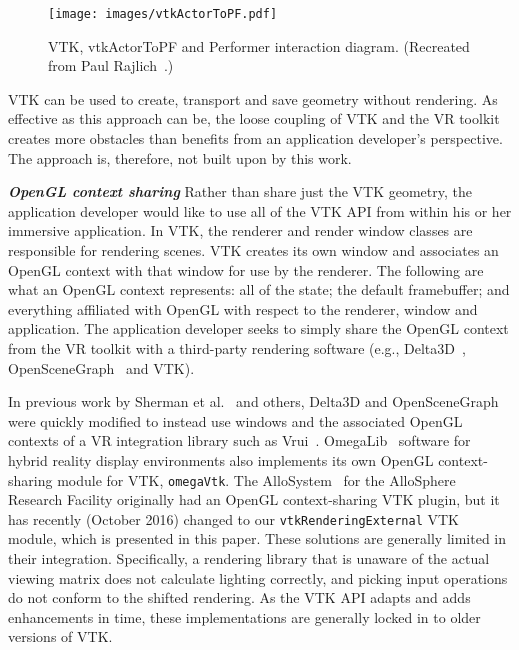 \begin{figure}[h!]
  \centering
  \texttt{[image: images/vtkActorToPF.pdf]}
  \caption{VTK, vtkActorToPF and Performer interaction diagram. (Recreated from Paul Rajlich~\cite{Leigh98limbo/vtk}.)}
  \label{fig:vtkActorToPF}
\end{figure}

VTK can be used to create, transport and save geometry without rendering. As effective as this approach can be, the loose coupling of VTK and the VR toolkit creates more obstacles than benefits from an application developer's perspective. The approach is, therefore, not built upon by this work.

\textbf{\textit{OpenGL context sharing}} Rather than share just the VTK geometry, the application developer would like to use all of the VTK API from within his or her immersive application.
In VTK, the renderer and render window classes are responsible for rendering scenes.
VTK creates its own window and associates an OpenGL context with that window for use by the renderer.
The following are what an OpenGL context represents: all of the state; the default framebuffer; and everything affiliated with OpenGL with respect to the renderer, window and application.
The application developer seeks to simply share the OpenGL context from the VR toolkit with a third-party rendering software (e.g., Delta3D~\cite{McDowell:2006}, OpenSceneGraph~\cite{Wang:2010} and VTK). 

In previous work by Sherman et al.~\cite{Sherman:2010} and others, Delta3D
and OpenSceneGraph were quickly modified to instead use windows and the associated
OpenGL contexts of a VR integration library such as Vrui~\cite{Kreylos:2006}.  
OmegaLib~\cite{Febretti:2014} software for hybrid reality display environments also implements its own OpenGL context-sharing module for VTK, \texttt{omegaVtk}. The AlloSystem~\cite{Amatriain:2009} for the AlloSphere Research Facility originally had an OpenGL context-sharing VTK plugin, but it has recently (October 2016) changed to our \texttt{vtkRenderingExternal} VTK module, which is presented in this paper.
These solutions are generally limited in their integration.
Specifically, a rendering library that is unaware of the actual
viewing matrix does not calculate lighting correctly, and
picking input operations do not conform to the shifted rendering. As the VTK API adapts and adds enhancements in time, these implementations are generally locked in to older versions of VTK.

